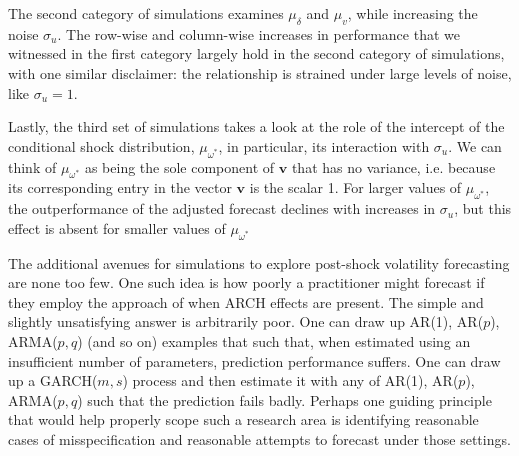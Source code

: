 \documentclass{uiucthesis2021}
\newcommand{\x}{\textbf{v}}
\theoremstyle{definition}
\begin{document}
The second category of simulations examines $\mu_{\delta}$ and $\mu_{v}$, while increasing the noise $\sigma_{u}$.  The row-wise and column-wise increases in performance that we witnessed in the first category largely hold in the second category of simulations, with one similar disclaimer: the relationship is strained under large levels of noise, like $\sigma_{u} = 1$.

Lastly, the third set of simulations takes a look at the role of the intercept of the conditional shock distribution, $\mu_{\omega^{*}}$, in particular, its interaction with $\sigma_{u}$.  We can think of $\mu_{\omega^{*}}$ as being the sole component of $\x$ that has no variance, i.e. because its corresponding entry in the vector $\x$ is the scalar 1.  For larger values of $\mu_{\omega^{*}}$, the outperformance of the adjusted forecast declines with increases in $\sigma_{u}$, but this effect is absent for smaller values of $\mu_{\omega^{*}}$

The additional avenues for simulations to explore post-shock volatility forecasting are none too few.  One such idea is how poorly a practitioner might forecast if they employ the approach of \cite[][]{lin2021minimizing} when ARCH effects are present.  The simple and slightly unsatisfying answer is arbitrarily poor.  One can draw up AR(1), AR($p$), ARMA($p,q$) (and so on) examples that such that, when estimated using an insufficient number of parameters, prediction performance suffers.  One can draw up a GARCH($m,s$) process and then estimate it with any of AR(1), AR($p$), ARMA($p,q$) such that the prediction fails badly.  Perhaps one guiding principle that would help properly scope such a research area is identifying reasonable cases of misspecification and reasonable attempts to forecast under those settings.
\end{document}
